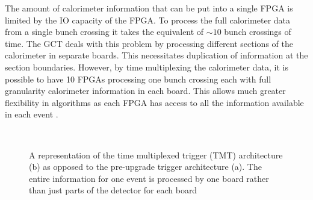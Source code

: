 
The amount of calorimeter information that can be put into a single
FPGA is limited by the IO capacity of the FPGA. To process the full
calorimeter data from a single bunch crossing it takes the equivalent
of $\sim10$ bunch crossings of time. The GCT deals with this problem
by processing different sections of the calorimeter in separate
boards. This necessitates duplication of information at the section
boundaries. However, by time multiplexing the calorimeter data, it is
possible to have 10 FPGAs processing one bunch crossing each with full
granularity calorimeter information in each board. This allows much
greater flexibility in algorithms as each FPGA has access to all the
information available in each event \cite{Baber1_2013}
\cite{TMTdemo2012}.

\begin{figure}[!t]
  \centering
   \\
  \caption{A representation of the time multiplexed trigger (TMT)
  architecture (b) as opposed to the pre-upgrade trigger architecture
  (a). The entire information for one event is processed by one board
  rather than just parts of the detector for each board \cite{1748-0221-9-10-C10034}}
  \label{fig:mhtmet_sideband}
\end{figure}

